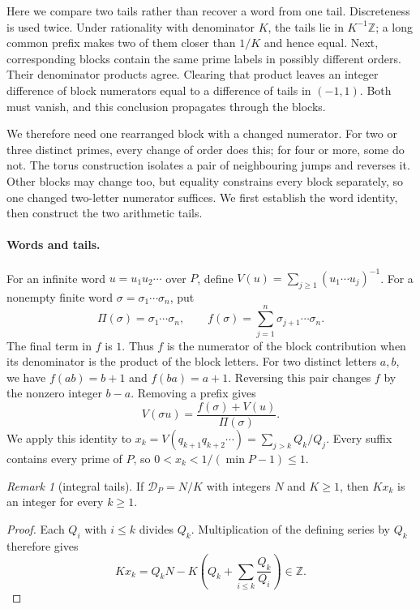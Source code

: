 \documentclass[11pt]{article}
\theoremstyle{remark}
\newtheorem{recordremark}[theorem]{Remark}
\renewenvironment{remark}[1][]{\begin{recordremark}[#1]}{\end{recordremark}}
\theoremstyle{plain}
\begin{document}
Here we compare two tails rather than recover a word from one tail.
Discreteness is used twice. Under rationality with denominator $K$, the
tails lie in $K^{-1}\mathbb Z$; a long common prefix makes two of them
closer than $1/K$ and hence equal. Next, corresponding blocks contain
the same prime labels in possibly different orders. Their denominator
products agree. Clearing that product leaves an integer difference of
block numerators equal to a difference of tails in $(-1,1)$. Both must
vanish, and this conclusion propagates through the blocks.

We therefore need one rearranged block with a changed numerator.
For two or three distinct primes, every change of order does this;
for four or more, some do not. The torus construction isolates a pair
of neighbouring jumps and reverses it. Other blocks may change too,
but equality constrains every block separately, so one changed
two-letter numerator suffices. We first establish the word identity,
then construct the two arithmetic tails.

\paragraph{Words and tails.}\label{long269:sec:words}
For an infinite word $u=u_1u_2\cdots$ over $P$, define
$V(u)=\sum_{j\ge1}(u_1\cdots u_j)^{-1}$. For a nonempty finite word
$\sigma=\sigma_1\cdots\sigma_n$, put
\[
 \Pi(\sigma)=\sigma_1\cdots\sigma_n,\qquad
 f(\sigma)=\sum_{j=1}^{n}\sigma_{j+1}\cdots\sigma_n.
\]
The final term in $f$ is $1$. Thus $f$ is the numerator of the block
contribution when its denominator is the product of the block letters.
For two distinct letters $a,b$, we have $f(ab)=b+1$ and $f(ba)=a+1$.
Reversing this pair changes $f$ by the nonzero integer $b-a$.
Removing a prefix gives
\begin{equation}\label{long269:eq:word-shift}
 V(\sigma u)=\frac{f(\sigma)+V(u)}{\Pi(\sigma)}.
\end{equation}
We apply this identity to
$x_k=V(q_{k+1}q_{k+2}\cdots)=\sum_{j>k}Q_k/Q_j$.
Every suffix contains every prime of $P$, so
$0<x_k<1/(\min P-1)\le1$.

\begin{remark}[integral tails]\label{long269:res:dp-integral-tails}
If $\mathcal D_P=N/K$ with integers $N$ and $K\ge1$, then $Kx_k$ is an
integer for every $k\ge1$.
\end{remark}
\begin{proof}
Each $Q_i$ with $i\le k$ divides $Q_k$. Multiplication of the defining
series by $Q_k$ therefore gives
\[
 Kx_k=Q_kN-K\left(Q_k+\sum_{i\le k}\frac{Q_k}{Q_i}\right)\in\mathbb Z.
\]
\end{proof}
\end{document}
